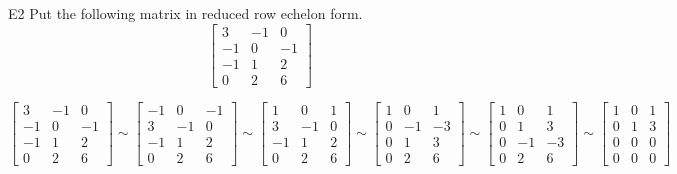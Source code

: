 \begin{problem}{E2}
Put the following matrix in reduced row echelon form.
$$\begin{bmatrix}
 3 & -1 & 0 \\
 -1 & 0 & -1 \\
 -1 & 1 & 2 \\
 0 & 2 & 6
\end{bmatrix}$$
\end{problem}
\begin{solution}
$$\begin{bmatrix}
 3 & -1 & 0 \\
 -1 & 0 & -1 \\
 -1 & 1 & 2 \\
 0 & 2 & 6
\end{bmatrix}
\sim 
\begin{bmatrix}
 -1 & 0 & -1 \\
 3 & -1 & 0 \\
 -1 & 1 & 2 \\
 0 & 2 & 6
\end{bmatrix}
\sim 
\begin{bmatrix}
 1 & 0 & 1 \\
 3 & -1 & 0 \\
 -1 & 1 & 2 \\
 0 & 2 & 6
\end{bmatrix}
\sim
\begin{bmatrix}
 1 & 0 & 1 \\
 0 & -1 & -3 \\
 0 & 1 & 3 \\
 0 & 2 & 6
\end{bmatrix}
\sim
\begin{bmatrix}
 1 & 0 & 1 \\
 0 & 1 & 3 \\
 0 & -1 & -3 \\
 0 & 2 & 6
\end{bmatrix}
\sim
\begin{bmatrix}
 1 & 0 & 1 \\
 0 & 1 & 3 \\
 0 & 0 & 0 \\ 
0 & 0 & 0 
\end{bmatrix}$$
\end{solution}

